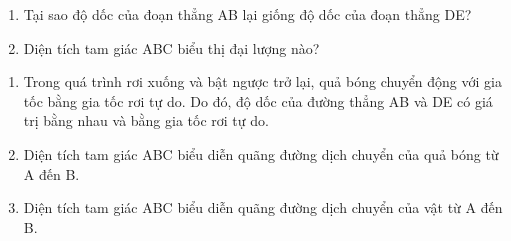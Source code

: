 \begin{enumerate}[label=\bfseries Bài \arabic*:,leftmargin=1.5cm]
{	\begin{enumerate}[label=\alph*)]
		\item Tại sao độ dốc của đoạn thẳng AB lại giống độ dốc của đoạn thẳng DE?
		\item Diện tích tam giác ABC biểu thị đại lượng nào?
	\end{enumerate}
}

\hideall
{	
	\begin{enumerate}[label=\alph*)]
		\item Trong quá trình rơi xuống và bật ngược trở lại, quả bóng chuyển động với gia tốc bằng gia tốc rơi tự do. Do đó, độ dốc của đường thẳng AB và DE có giá trị bằng nhau và bằng gia tốc rơi tự do.
		
		
		\item Diện tích tam giác ABC biểu diễn quãng đường dịch chuyển của quả bóng từ A đến B.
		
		
		\item Diện tích tam giác ABC biểu diễn quãng đường dịch chuyển của vật từ A đến B.
		
		
	\end{enumerate}
}
\end{enumerate}
